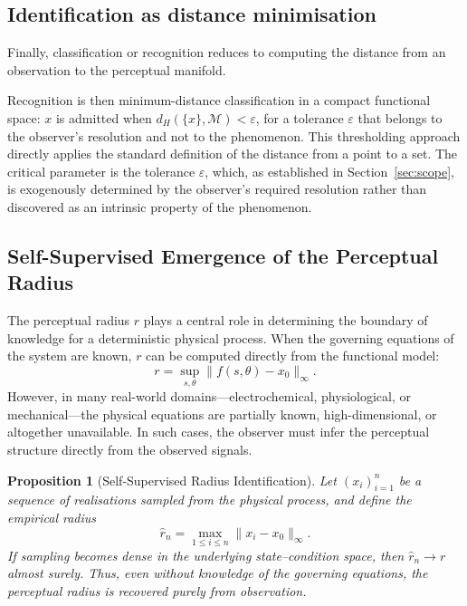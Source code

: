 \documentclass[10pt]{article}
\theoremstyle{plain}
\newtheorem{proposition}[theorem]{Proposition}
\theoremstyle{definition}
\theoremstyle{remark}
\begin{document}
\subsection{Identification as distance minimisation}

Finally, classification or recognition reduces to computing the distance from an
observation to the perceptual manifold.

Recognition is then minimum-distance classification in a compact functional
space: $x$ is admitted when $d_H(\{x\},\mathcal{M}) < \varepsilon$, for a
tolerance $\varepsilon$ that belongs to the observer's resolution and not to the
phenomenon. This thresholding approach directly applies the standard definition
of the distance from a point to a set. The critical parameter is the tolerance
$\varepsilon$, which, as established in Section~\ref{sec:scope}, is exogenously
determined by the observer's required resolution rather than discovered as an
intrinsic property of the phenomenon.

\subsection{Self-Supervised Emergence of the Perceptual Radius}

The perceptual radius $r$ plays a central role in determining the boundary of 
knowledge for a deterministic physical process. When the governing equations 
of the system are known, $r$ can be computed directly from the functional 
model:
\[
r = \sup_{s,\theta} \| f(s,\theta) - x_0 \|_\infty.
\]
However, in many real-world domains—electrochemical, physiological, or 
mechanical—the physical equations are partially known, high-dimensional, or 
altogether unavailable. In such cases, the observer must infer the perceptual 
structure directly from the observed signals.

\begin{proposition}[Self-Supervised Radius Identification]
\label{prop:selfsupervised}
Let $(x_i)_{i=1}^n$ be a sequence of realisations sampled from the physical 
process, and define the empirical radius
\[
\hat{r}_n = \max_{1 \le i \le n} \| x_i - x_0 \|_\infty.
\]
If sampling becomes dense in the underlying state–condition space, then 
$\hat{r}_n \to r$ almost surely. 
Thus, even without knowledge of the governing equations, the perceptual radius 
is recovered purely from observation.
\end{proposition}
\end{document}

